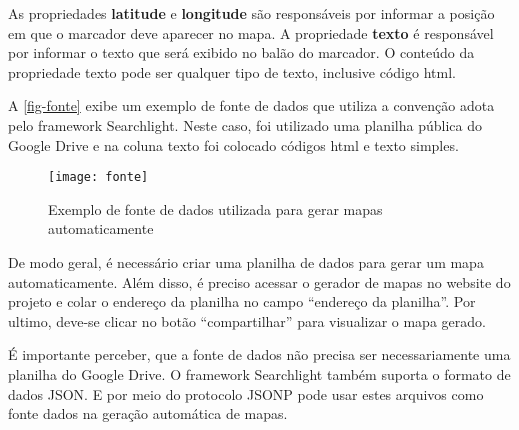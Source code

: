 As propriedades \textbf{latitude} e \textbf{longitude} são responsáveis por informar a posição em que o marcador deve aparecer no mapa. A propriedade \textbf{texto} é responsável por informar o texto que será exibido no balão do marcador. O conteúdo da propriedade texto pode ser qualquer tipo de texto, inclusive código html.

 A \autoref{fig-fonte} exibe um exemplo de fonte de dados que utiliza a convenção adota pelo framework Searchlight. Neste caso, foi utilizado uma planilha pública do Google Drive e na coluna texto foi colocado  códigos html e texto simples. 		
  
 \begin{figure}[htb]
	\caption{\label{fig-fonte}Exemplo de fonte de dados utilizada para gerar mapas automaticamente}
	\begin{center}
	    \texttt{[image: fonte]}
	\end{center}
\end{figure}

De modo geral, é necessário criar uma planilha de dados para  gerar um mapa automaticamente. Além disso, é preciso acessar o gerador de mapas no website do projeto e colar o endereço  da planilha no campo ``endereço da planilha''. Por ultimo, deve-se clicar no botão ``compartilhar'' para visualizar o mapa gerado.

É importante perceber, que a fonte de dados não precisa ser necessariamente uma planilha do Google Drive. O framework Searchlight também suporta o formato de dados JSON. E por meio do protocolo JSONP pode usar estes arquivos como fonte dados na geração automática de mapas.  
